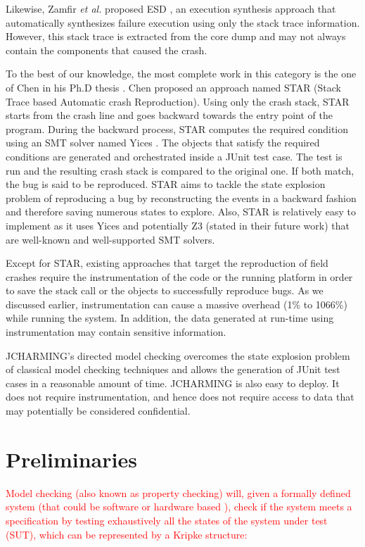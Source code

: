 \documentclass[times, doublespace]{smrauth}
\newcommand{\red}[1]{\textcolor{red}{#1}}
\begin{document}
Likewise, Zamfir {\it et al.} proposed ESD \cite{Zamfir2010}, an execution synthesis approach that automatically synthesizes failure execution using only the stack trace information. However, this stack trace is extracted from the core dump and may not always contain the components that caused the crash.

To the best of our knowledge, the most complete work in this category is the one of Chen in his Ph.D thesis \cite{Chen2013a}. Chen proposed an approach named STAR (Stack Trace based Automatic crash Reproduction). Using only the crash stack, STAR starts from the crash line and goes backward towards the entry point of the program. During the backward process, STAR computes the required condition using an SMT solver named Yices \cite{Dutertre2006}. The objects that satisfy the required conditions are generated and orchestrated inside a JUnit test case. The test is run and the resulting crash stack is compared to the original one. If both match, the bug is said to be reproduced. STAR aims to tackle the state explosion problem of reproducing a bug by reconstructing the events in a backward fashion and therefore saving numerous states to explore. Also, STAR is relatively easy to implement as it uses Yices \cite{Dutertre2006} and potentially Z3 \cite{de2008z3} (stated in their future work) that are well-known and well-supported SMT solvers.

Except for STAR, existing approaches that target the reproduction of
field crashes require the instrumentation of the code or the running
platform in order to save the stack call or the objects to successfully
reproduce bugs. As we discussed earlier, instrumentation can cause a massive
overhead (1\% to 1066\%) while running the system.
In addition, the data generated at run-time using instrumentation
may contain sensitive information.

JCHARMING's directed model checking overcomes the state explosion problem of
classical model checking techniques and allows the generation of
JUnit test cases in a reasonable amount of time.
JCHARMING is also easy to deploy. It does not require instrumentation,
and hence does not require access to data that may potentially
be considered confidential.


\section{Preliminaries\label{sec:prelimenaries}}

\red{Model checking (also known as property checking) will, given a formally defined system
(that could be software \cite{Visser2003} or hardware based
\cite{kropf1999introduction}), check if the system meets a specification
by testing exhaustively all the states of the system under test (SUT),
which can be represented by a Kripke \cite{Kripke1963} structure:}
\end{document}
